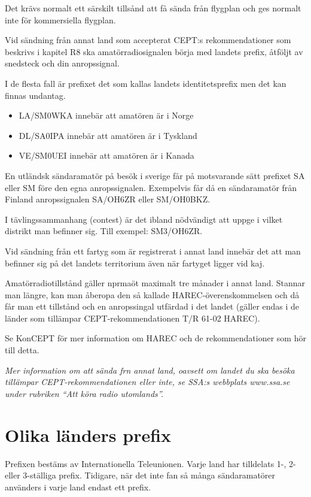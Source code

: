 Det krävs normalt ett särskilt tillsånd att få sända från flygplan och
ges normalt inte för kommersiella flygplan.

Vid sändning från annat land som accepterat CEPT:s rekommendationer
som beskrivs i kapitel R8 ska amatörradiosignalen börja med landets
prefix, åtföljt av snedsteck och din anropssignal.

I de flesta fall är prefixet det som kallas landets identitetsprefix
men det kan finnas undantag.

\begin{itemize}
\item LA/SM0WKA innebär att amatören är i Norge
\item DL/SA0IPA innebär att amatören är i Tyskland
\item VE/SM0UEI innebär att amatören är i Kanada
\end{itemize}

En utländsk sändaramatör på besök i sverige får på motsvarande sätt
prefixet SA eller SM före den egna anropssignalen. Exempelvis får då
en sändaramatör från Finland anropssignalen SA/OH6ZR eller SM/OH0BKZ.

I tävlingssammanhang (contest) är det ibland nödvändigt att uppge i
vilket distrikt man befinner sig. Till exempel: SM3/OH6ZR.

Vid sändning från ett fartyg som är registrerat i annat land innebär
det att man befinner sig på det landets territorium även när fartyget
ligger vid kaj.

Amatörradiotillstånd gäller nprmaöt maximalt tre månader i annat land.
Stannar man längre, kan man åberopa den så kallade
HAREC-överenskommelsen och då får man ett tillstånd och en
anropssingal utfärdad i det landet (gäller endas i de länder som
tillämpar CEPT-rekommendationen T/R 61-02 HAREC).

Se KonCEPT för mer information om HAREC och de rekommendationer som
hör till detta.

\emph{Mer information om att sända frn annat land, oavsett om landet
  du ska besöka tillämpar CEPT-rekommendationen eller inte, se SSA:s
  webbplats www.ssa.se under rubriken ``Att köra radio utomlands''.}

\section{Olika länders prefix}

Prefixen bestäms av Internationella Teleunionen. Varje land har
tilldelats 1-, 2- eller 3-ställiga prefix. Tidigare, när det inte fan
så många sändaramatörer använders i varje land endast ett prefix.

